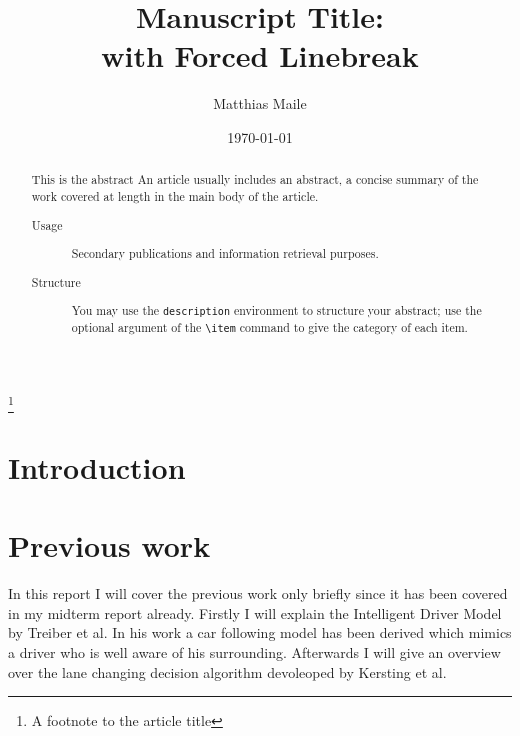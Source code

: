 \documentclass[%
 reprint,
 amsmath,amssymb,
 aps,
]{revtex4-2}
\begin{document}

\title{Manuscript Title:\\with Forced Linebreak}%
\thanks{A footnote to the article title}%

\author{Matthias Maile}

\date{\today}%

\begin{abstract}
  This is the abstract
  An article usually includes an abstract, a concise summary of the work
  covered at length in the main body of the article. 
  \begin{description}
    \item[Usage]
      Secondary publications and information retrieval purposes.
    \item[Structure]
      You may use the \texttt{description} environment to structure your abstract;
      use the optional argument of the \verb+\item+ command to give the category of each item. 
  \end{description}
\end{abstract}

\maketitle

\tableofcontents

\section{Introduction}
\label{sec:introduction}

\section{Previous work}
\label{sec:previous_work}
In this report I will cover the previous work only briefly since it has been covered in my midterm report already.
Firstly I will explain the Intelligent Driver Model by Treiber et al. In his work a car following model has been derived
which mimics a driver who is well aware of his surrounding. Afterwards I will give an overview over the lane changing
decision algorithm devoleoped by Kersting et al.
\end{document}
